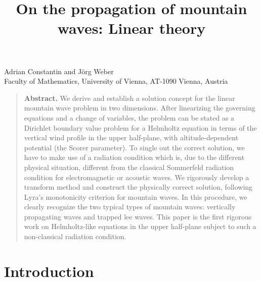 \documentclass[11pt,twoside,reqno,centertags]{amsart}
\theoremstyle{definition}
\begin{document}
 
\title{On the propagation of mountain waves: Linear theory}
\date{}
\maketitle     
 
\vspace{ -1\baselineskip}


{\small
\begin{center}
 {\sc Adrian Constantin} and {\sc J\"org Weber} \\
Faculty of Mathematics, University of Vienna, AT-1090 Vienna, Austria
\end{center}
}

\allowdisplaybreaks
 
 
\smallskip
 

 
 \begin{quote}
\footnotesize
{\bf Abstract.}  
We derive and establish a solution concept for the linear mountain wave problem in two dimensions. After linearizing the governing equations and a change of variables, the problem can be stated as a Dirichlet boundary value problem for a Helmholtz equation in terms of the vertical wind profile in the upper half-plane, with altitude-dependent potential (the Scorer parameter). To single out the correct solution, we have to make use of a radiation condition which is, due to the different physical situation, different from the classical Sommerfeld radiation condition for electromagnetic or acoustic waves. We rigorously develop a transform method and construct the physically correct solution, following Lyra's monotonicity criterion for mountain waves. In this procedure, we clearly recognize the two typical types of mountain waves: vertically propagating waves and trapped lee waves. This paper is the first rigorous work on Helmholtz-like equations in the upper half-plane subject to such a non-classical radiation condition.
\end{quote}

\section{Introduction}
\end{document}
